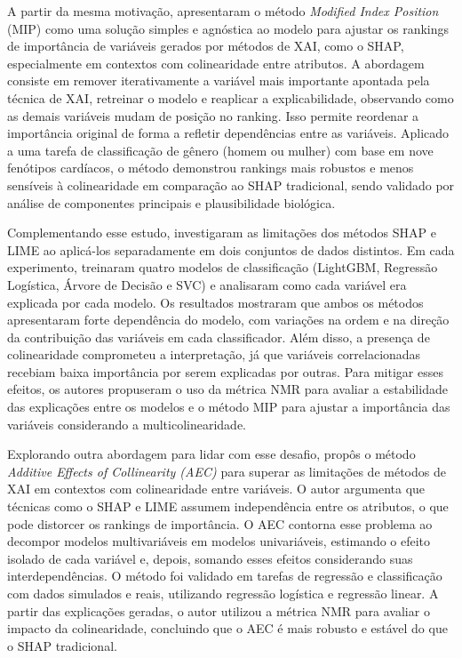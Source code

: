 A partir da mesma motivação,  apresentaram o método \textit{Modified Index Position} (MIP) como uma solução simples e agnóstica ao modelo para ajustar os rankings de importância de variáveis gerados por métodos de XAI, como o SHAP, especialmente em contextos com colinearidade entre atributos. A abordagem consiste em remover iterativamente a variável mais importante apontada pela técnica de XAI, retreinar o modelo e reaplicar a explicabilidade, observando como as demais variáveis mudam de posição no ranking. Isso permite reordenar a importância original de forma a refletir dependências entre as variáveis. Aplicado a uma tarefa de classificação de gênero (homem ou mulher) com base em nove fenótipos cardíacos, o método demonstrou rankings mais robustos e menos sensíveis à colinearidade em comparação ao SHAP tradicional, sendo validado por análise de componentes principais e plausibilidade biológica.

Complementando esse estudo,  investigaram as limitações dos métodos SHAP e LIME ao aplicá-los separadamente em dois conjuntos de dados distintos. Em cada experimento, treinaram quatro modelos de classificação (LightGBM, Regressão Logística, Árvore de Decisão e SVC) e analisaram como cada variável era explicada por cada modelo. Os resultados mostraram que ambos os métodos apresentaram forte dependência do modelo, com variações na ordem e na direção da contribuição das variáveis em cada classificador. Além disso, a presença de colinearidade comprometeu a interpretação, já que variáveis correlacionadas recebiam baixa importância por serem explicadas por outras. Para mitigar esses efeitos, os autores propuseram o uso da métrica NMR para avaliar a estabilidade das explicações entre os modelos e o método MIP para ajustar a importância das variáveis considerando a multicolinearidade. 

Explorando outra abordagem para lidar com esse desafio,  propôs o método \textit{Additive Effects of Collinearity (AEC)} para superar as limitações de métodos de XAI em contextos com colinearidade entre variáveis. O autor argumenta que técnicas como o SHAP e LIME assumem independência entre os atributos, o que pode distorcer os rankings de importância. O AEC contorna esse problema ao decompor modelos multivariáveis em modelos univariáveis, estimando o efeito isolado de cada variável e, depois, somando esses efeitos considerando suas interdependências. O método foi validado em tarefas de regressão e classificação com dados simulados e reais, utilizando regressão logística e regressão linear. A partir das explicações geradas, o autor utilizou a métrica NMR para avaliar o impacto da colinearidade, concluindo que o AEC é mais robusto e estável do que o SHAP tradicional.

